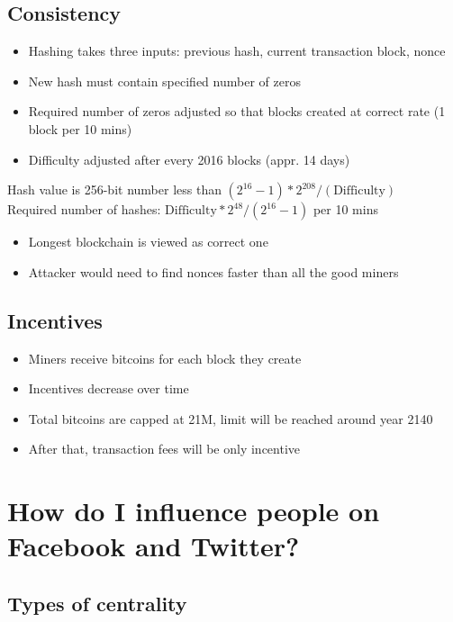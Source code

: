 \documentclass{article}
\begin{document}
\subsection{Consistency}

\begin{itemize}
\item Hashing takes three inputs: previous hash, current transaction block, nonce
\item New hash must contain specified number of zeros
\item Required number of zeros adjusted so that blocks created at correct rate (1 block per 10 mins)
\item Difficulty adjusted after every 2016 blocks (appr. 14 days)
\end{itemize}
Hash value is 256-bit number less than $(2^{16} - 1) * 2^{208} / (\text{Difficulty})$ \\
Required number of hashes: $\text{Difficulty} * 2^{48} / (2^{16} - 1)$ per 10 mins
\begin{itemize}
\item Longest blockchain is viewed as correct one
\item Attacker would need to find nonces faster than all the good miners
\end{itemize}

\subsection{Incentives}

\begin{itemize}
\item Miners receive bitcoins for each block they create
\item Incentives decrease over time
\item Total bitcoins are capped at 21M, limit will be reached around year 2140
\item After that, transaction fees will be only incentive
\end{itemize}

\section{How do I influence people on Facebook and Twitter?}

\subsection{Types of centrality}
\end{document}

